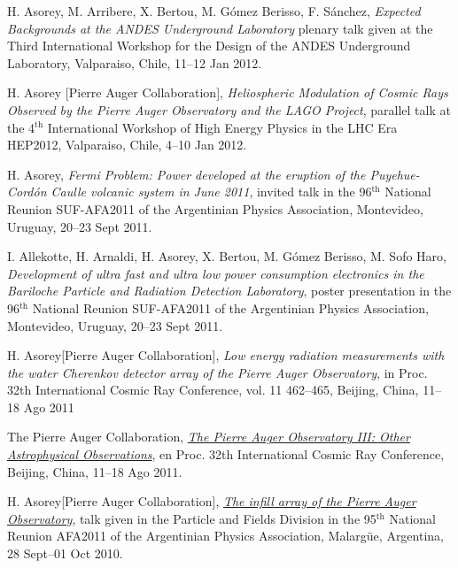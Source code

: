 \documentclass[11pt, a4paper]{article}
\newcommand{\years}[1]{\marginnote{\scriptsize #1}}
\begin{document}
\begin{etaremune}
\item \years{2012} H. Asorey, M. Arribere, X. Bertou, M. Gómez Berisso, F. Sánchez, 
{\emph{Expected Backgrounds at the ANDES Underground Laboratory}}
plenary talk given at the Third International Workshop for the Design of the
ANDES Underground Laboratory, Valparaiso, Chile, 11--12 Jan 2012.

\item \years{2012}H. Asorey [Pierre Auger Collaboration], {\emph{Heliospheric
Modulation of Cosmic Rays Observed by the Pierre Auger Observatory and the LAGO
Project}}, parallel talk at the 4$^{\mathrm{th}}$ International Workshop of High Energy
Physics in the LHC Era HEP2012, Valparaiso, Chile, 4--10 Jan 2012.

\item \years{2011}H. Asorey, {\emph{Fermi Problem: Power developed at the eruption of
the Puyehue-Cordón Caulle volcanic system in June 2011}}, invited talk in the
96$^{\mathrm{th}}$ National Reunion SUF-AFA2011 of the Argentinian Physics Association,
Montevideo, Uruguay, 20--23 Sept 2011.

\item \years{2011}I. Allekotte, H. Arnaldi, H. Asorey, X. Bertou, M. Gómez Berisso,
M. Sofo Haro, {\emph{Development of ultra fast and ultra low power consumption
electronics in the Bariloche Particle and Radiation Detection Laboratory}},
poster presentation in the 96$^{\mathrm{th}}$ National Reunion SUF-AFA2011 of the Argentinian
Physics Association, Montevideo, Uruguay, 20--23 Sept 2011.

\item \years{2011}H. Asorey[Pierre Auger Collaboration], {\emph{Low energy radiation
measurements with the water Cherenkov detector array of the Pierre Auger
Observatory}}, in Proc. 32th International Cosmic Ray Conference, vol. 11
462--465, Beijing, China, 11--18 Ago 2011

\item \years{2011}The Pierre Auger Collaboration,
\href{http://arxiv.org/abs/1107.4805}{\emph{The Pierre Auger Observatory III:
Other Astrophysical Observations}}, en Proc. 32th International Cosmic Ray
Conference, Beijing, China, 11--18 Ago 2011.

\item \years{2010}H. Asorey[Pierre Auger Collaboration],
\href{http://95rnf.afa.webfactional.com/tex\_files/Resumenes/DPyC/PyC\_6.pdf}{\emph{The
infill array of the Pierre Auger Observatory}}, talk given in the Particle and
Fields Division in the 95$^{\mathrm{th}}$ National Reunion AFA2011 of the Argentinian Physics
Association, Malargüe, Argentina, 28 Sept--01 Oct 2010.


\end{etaremune}
\end{document}
